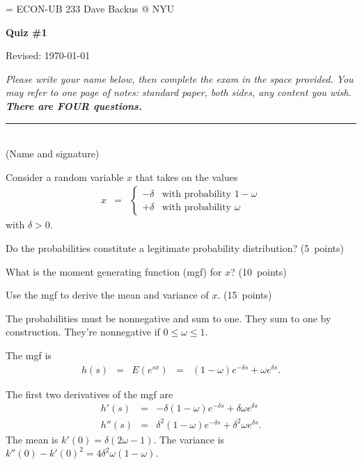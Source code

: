 \documentclass[11pt]{exam}
\begin{document}
\parskip=\bigskipamount
\parindent=0.0in
\thispagestyle{empty}
{\large ECON-UB 233 \hfill Dave Backus @ NYU}

\bigskip\bigskip
\centerline{\Large \bf Quiz \#1}
\centerline{Revised: \today}

\bigskip
{\it Please write your name below,
then complete the exam in the space provided.
You may refer to one page of notes:
standard paper, both sides, any content you wish.
{\bf There are FOUR questions.}
}

\bigskip
\begin{flushleft}
\rule{4in}{0.5pt} \\ (Name and signature)
\end{flushleft}

\begin{questions}
Consider a random variable $x$ that takes on the values
\begin{eqnarray*}
    x &=& \left\{
          \begin{array}{ll}
          - \delta  & \mbox{with probability } 1-\omega \\
          +\delta    & \mbox{with probability } \omega
          \end{array}
          \right.
\end{eqnarray*}
with $\delta > 0$.
%
\begin{parts}
\item Do the probabilities constitute a legitimate probability distribution?
(5~points)
\item What is the moment generating function (mgf) for $x$?
(10~points)
\item Use the mgf to derive the mean and variance of $x$.
(15~points)
\end{parts}

\begin{solution}
\begin{parts}
\item The probabilities must be nonnegative and sum to one.
They sum to one by construction.
They're nonnegative if $ 0 \leq \omega \leq 1$.
\item The mgf is
\begin{eqnarray*}
    h(s) &=& E (e^{sx}) \;\;=\;\;
            (1-\omega) e^{-\delta s} + \omega e^{\delta s} .
\end{eqnarray*}
\item The first two derivatives of the mgf are
\begin{eqnarray*}
    h'(s) &=& - \delta (1-\omega) e^{-\delta s} + \delta \omega e^{\delta s} \\
    h''(s) &=& \delta^2 (1-\omega) e^{-\delta s} + \delta^2 \omega e^{\delta s} .
\end{eqnarray*}
The mean is $k'(0) = \delta(2\omega-1)$.
The variance is
$  k''(0) - k'(0)^2 = 4 \delta^2 \omega(1-\omega)$.
\end{parts}
\end{solution}


\end{questions}
\end{document}
